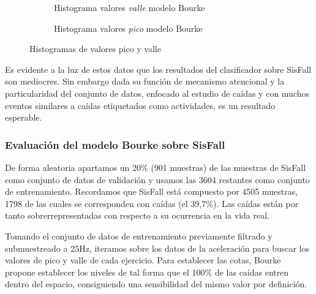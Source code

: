 \begin{figure}[htb!]
  \centering
  \begin{subfigure}[b]{0.48\textwidth}
      \centering
      \caption{Histograma valores \textit{valle} modelo Bourke}
      \label{fig:bourke:hist:low}
  \end{subfigure}
  \hfill
  \begin{subfigure}[b]{0.48\textwidth}
      \centering
      \caption{Histograma valores \textit{pico} modelo Bourke}
      \label{fig:bourke:hist:high}
  \end{subfigure}
  \caption{\label{fig:bourke:hist} Histogramas de valores pico y valle}
\end{figure}

Es evidente a la luz de estos datos que los resultados del clasificador sobre SisFall son mediocres. Sin embargo dada su función de mecanismo atencional y la particularidad del conjunto de datos, enfocado al estudio de caídas y con muchos eventos similares a caídas etiquetados como actividades, es un resultado esperable.


\subsubsection{Evaluación del modelo Bourke sobre SisFall}

De forma aleatoria apartamos un 20\% (901 muestras) de las muestras de SisFall como conjunto de datos de validación y usamos las 3604 restantes como conjunto de entrenamiento. Recordamos que SisFall está compuesto por 4505 muestras, 1798 de las cuales se corresponden con caídas (el 39,7\%). Las caídas están por tanto sobrerrepresentadas con respecto a su ocurrencia en la vida real.

Tomando el conjunto de datos de entrenamiento previamente filtrado y submuestreado a 25Hz, iteramos sobre los datos de la aceleración para buscar los valores de pico y valle de cada ejercicio. Para establecer las cotas, Bourke propone establecer los niveles de tal forma que el 100\% de las caídas entren dentro del espacio, consiguiendo una sensibilidad del mismo valor por definición. 



